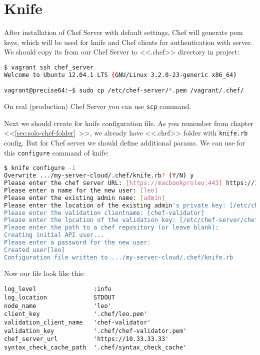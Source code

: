 \section{Knife}
\label{sec:server-knife}

After installation of Chef Server with default settings, Chef will generate pem keys, which will be used for knife and Chef clients for authentication with server. We should copy its from our Chef Server to <<.chef>> directory in project:

\begin{lstlisting}[language=Bash,label=lst:my-server-cloud-knife1]
$ vagrant ssh chef_server
Welcome to Ubuntu 12.04.1 LTS (GNU/Linux 3.2.0-23-generic x86_64)

vagrant@precise64:~$ sudo cp /etc/chef-server/*.pem /vagrant/.chef/
\end{lstlisting}

On real (production) Chef Server you can use \lstinline!scp! command.

Next we should create for knife configuration file. As you remember from chapter <<\ref{sec:solo-chef-folder}~>>, we already have <<.chef>> folder with \lstinline!knife.rb! config. But for Chef server we should define additional params. We can use for this \lstinline!configure! command of knife:

\begin{lstlisting}[language=Bash,label=lst:my-server-cloud-knife2]
$ knife configure -i
Overwrite .../my-server-cloud/.chef/knife.rb? (Y/N) y
Please enter the chef server URL: [https://macbookproleo:443] https://10.33.33.33
Please enter a name for the new user: [leo]
Please enter the existing admin name: [admin]
Please enter the location of the existing admin's private key: [/etc/chef-server/admin.pem] .chef/admin.pem
Please enter the validation clientname: [chef-validator]
Please enter the location of the validation key: [/etc/chef-server/chef-validator.pem] .chef/chef-validator.pem
Please enter the path to a chef repository (or leave blank):
Creating initial API user...
Please enter a password for the new user:
Created user[leo]
Configuration file written to .../my-server-cloud/.chef/knife.rb
\end{lstlisting}

Now our file look like this:

\begin{lstlisting}[label=lst:my-server-cloud-knife3,title=my-server-cloud/.chef/knife.rb]
log_level                :info
log_location             STDOUT
node_name                'leo'
client_key               '.chef/leo.pem'
validation_client_name   'chef-validator'
validation_key           '.chef/chef-validator.pem'
chef_server_url          'https://10.33.33.33'
syntax_check_cache_path  '.chef/syntax_check_cache'
\end{lstlisting}

